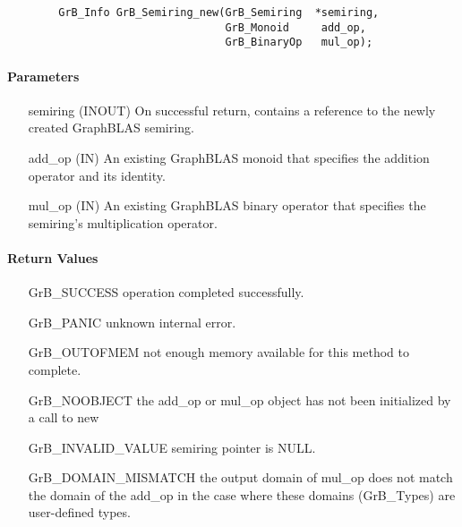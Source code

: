 \begin{verbatim}
        GrB_Info GrB_Semiring_new(GrB_Semiring  *semiring,
                                  GrB_Monoid     add_op,
                                  GrB_BinaryOp   mul_op);
\end{verbatim}

\paragraph{Parameters}

\begin{itemize}[leftmargin=1.1in]
    \item[{\sf semiring}] ({\sf INOUT}) On successful return, contains a 
    reference to the newly created GraphBLAS semiring.
    \item[{\sf add\_op}]  ({\sf IN}) An existing GraphBLAS monoid that specifies 
    the addition operator and its identity.
    \item[{\sf mul\_op}]  ({\sf IN}) An existing GraphBLAS binary operator that 
    specifies the semiring's multiplication operator.
\end{itemize}


\paragraph{Return Values}

\begin{itemize}[leftmargin=2.1in]
\item[{\sf GrB\_SUCCESS}]           operation completed successfully.
\item[{\sf GrB\_PANIC}]             unknown internal error.
\item[{\sf GrB\_OUTOFMEM}]          not enough memory available for this method to complete.
\item[{\sf GrB\_NOOBJECT}]          the {\sf add\_op} or {\sf mul\_op} object has
                                    not been initialized by a call to {\sf new}
\item[{\sf GrB\_INVALID\_VALUE}]    {\sf semiring} pointer is {\sf NULL}.
\item[{\sf GrB\_DOMAIN\_MISMATCH}]  the output domain of {\sf mul\_op} does not
                                    match the domain of the {\sf add\_op} in the
                                    case where these domains ({\sf GrB\_Type}s)
                                    are user-defined types.
\end{itemize}

